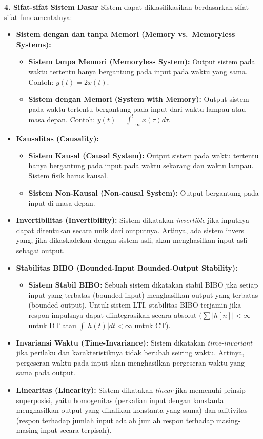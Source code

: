 \documentclass[
  letterpaper,
  DIV=11,
  numbers=noendperiod]{scrreprt}
\providecommand{\tightlist}{%
  \setlength{\itemsep}{0pt}\setlength{\parskip}{0pt}}
\begin{document}
\textbf{4. Sifat-sifat Sistem Dasar} Sistem dapat diklasifikasikan
berdasarkan sifat-sifat fundamentalnya:

\begin{itemize}
\tightlist
\item
  \textbf{Sistem dengan dan tanpa Memori (Memory vs.~Memoryless
  Systems):}

  \begin{itemize}
  \tightlist
  \item
    \textbf{Sistem tanpa Memori (Memoryless System):} Output sistem pada
    waktu tertentu hanya bergantung pada input pada waktu yang sama.
    Contoh: \(y(t) = 2x(t)\).
  \item
    \textbf{Sistem dengan Memori (System with Memory):} Output sistem
    pada waktu tertentu bergantung pada input dari waktu lampau atau
    masa depan. Contoh: \(y(t) = \int_{-\infty}^{t} x(\tau)d\tau\).
  \end{itemize}
\item
  \textbf{Kausalitas (Causality):}

  \begin{itemize}
  \tightlist
  \item
    \textbf{Sistem Kausal (Causal System):} Output sistem pada waktu
    tertentu hanya bergantung pada input pada waktu sekarang dan waktu
    lampau. Sistem fisik harus kausal.
  \item
    \textbf{Sistem Non-Kausal (Non-causal System):} Output bergantung
    pada input di masa depan.
  \end{itemize}
\item
  \textbf{Invertibilitas (Invertibility):} Sistem dikatakan
  \emph{invertible} jika inputnya dapat ditentukan secara unik dari
  outputnya. Artinya, ada sistem invers yang, jika dikaskadekan dengan
  sistem asli, akan menghasilkan input asli sebagai output.
\item
  \textbf{Stabilitas BIBO (Bounded-Input Bounded-Output Stability):}

  \begin{itemize}
  \tightlist
  \item
    \textbf{Sistem Stabil BIBO:} Sebuah sistem dikatakan stabil BIBO
    jika setiap input yang terbatas (bounded input) menghasilkan output
    yang terbatas (bounded output). Untuk sistem LTI, stabilitas BIBO
    terjamin jika respon impulsnya dapat diintegrasikan secara absolut
    (\(\sum |h[n]| < \infty\) untuk DT atau \(\int |h(t)| dt < \infty\)
    untuk CT).
  \end{itemize}
\item
  \textbf{Invariansi Waktu (Time-Invariance):} Sistem dikatakan
  \emph{time-invariant} jika perilaku dan karakteristiknya tidak berubah
  seiring waktu. Artinya, pergeseran waktu pada input akan menghasilkan
  pergeseran waktu yang sama pada output.
\item
  \textbf{Linearitas (Linearity):} Sistem dikatakan \emph{linear} jika
  memenuhi prinsip superposisi, yaitu homogenitas (perkalian input
  dengan konstanta menghasilkan output yang dikalikan konstanta yang
  sama) dan aditivitas (respon terhadap jumlah input adalah jumlah
  respon terhadap masing-masing input secara terpisah).
\end{itemize}
\end{document}
